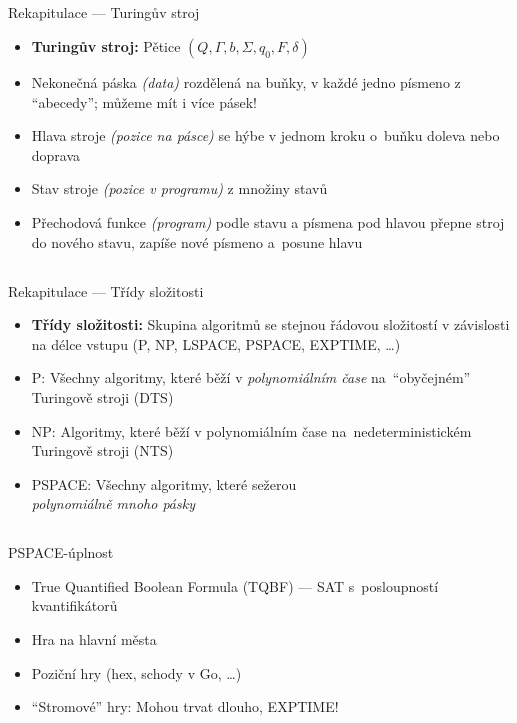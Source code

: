 \documentclass{beamer}
\begin{document}
\subsection{}
\begin{frame}{Rekapitulace --- Turingův stroj}
\begin{itemize}
\item {\bf Turingův stroj:} Pětice $(Q, \Gamma, b, \Sigma, q_0, F, \delta)$
\item Nekonečná páska {\em (data)} rozdělená na buňky, v každé jedno písmeno z ``abecedy'';
	můžeme mít i více pásek!
\item Hlava stroje {\em (pozice na pásce)} se hýbe v jednom kroku o~buňku doleva nebo doprava
\item Stav stroje {\em (pozice v programu)} z množiny stavů
\item Přechodová funkce {\em (program)} podle stavu a písmena pod hlavou přepne stroj do nového stavu, zapíše nové písmeno a~posune hlavu
\end{itemize}
\end{frame}

\subsection{}
\begin{frame}{Rekapitulace --- Třídy složitosti}
\begin{itemize}
\item {\bf Třídy složitosti:} Skupina algoritmů se stejnou řádovou složitostí v závislosti na délce vstupu (P, NP, LSPACE, PSPACE, EXPTIME, \dots)
\item P: Všechny algoritmy, které běží v {\em polynomiálním čase} na~``obyčejném'' Turingově stroji (DTS)
\item NP: Algoritmy, které běží v polynomiálním čase na~nedeterministickém Turingově stroji (NTS)
\item PSPACE: Všechny algoritmy, které sežerou \\ {\em polynomiálně mnoho pásky}
\end{itemize}
\end{frame}

\subsection{}
\begin{frame}{PSPACE-úplnost}
\begin{itemize}
\item True Quantified Boolean Formula (TQBF) --- SAT s~posloupností kvantifikátorů
\item Hra na hlavní města
\item Poziční hry (hex, schody v Go, \dots)
\item ``Stromové'' hry: Mohou trvat dlouho, EXPTIME!
\end{itemize}
\end{frame}
\end{document}
